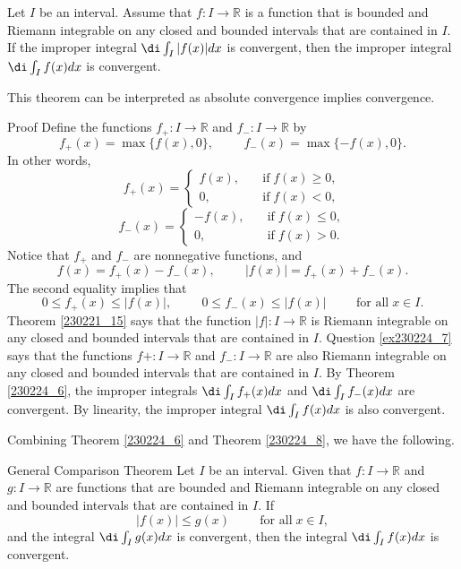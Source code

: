 \begin{example}[label=20230527]{}
\begin{theorem}[label=230224_8]{} Let $I$ be an interval.
Assume that $f:I\to\mathbb{R}$ is a function that is bounded and Riemann integrable on any closed and bounded intervals that are contained in $I$. If the improper integral $\di\int_I|f(x)|dx$ is convergent, then the improper integral $\di\int_If(x)dx$ is convergent.
\end{theorem}This theorem can be interpreted as absolute convergence implies convergence.
\begin{myproof}{Proof}
 Define the functions $f_+:I\to\mathbb{R}$ and $f_-:I\to\mathbb{R}$ by
\[f_+(x)=\max\{f(x), 0\},\hspace{1cm}f_-(x)=\max\{-f(x),0\}.\]
In other words,  \[f_+(x)=\begin{cases} f(x),\quad &\text{if}\; f(x)\geq 0,\\0,\quad &\text{if}\;f(x)<0,\end{cases}\]
\[f_-(x)=\begin{cases} -f(x),\quad &\text{if}\; f(x)\leq 0,\\0,\quad &\text{if}\;f(x)>0.\end{cases}\]  Notice that $f_+$ and $f_-$ are nonnegative functions, and
\[f(x)=f_+(x)-f_-(x),\hspace{1cm}|f(x)|=f_+(x)+f_-(x).\]
The second equality implies that
\[0\leq f_+(x)\leq |f(x)|,\hspace{1cm}0\leq f_-(x)\leq |f(x)|\hspace{1cm}\text{for all}\;x\in I.\]Theorem \ref{230221_15} says that the function $|f|:I\to\mathbb{R}$ is Riemann integrable on any closed and bounded intervals that are contained in $I$. \bp Question \ref{ex230224_7} says that the functions $f+:I\to\mathbb{R}$ and $f_-:I\to\mathbb{R}$ are also Riemann integrable on any closed and bounded intervals that are contained in $I$.  By Theorem  \ref{230224_6}, the improper integrals $\di \int_If_+(x)dx$ and $\di \int_If_-(x)dx$ are convergent. By linearity, the improper integral $\di\int_I f(x)dx$ is also convergent.

\end{myproof}

Combining Theorem \ref{230224_6} and Theorem \ref{230224_8}, we have the following.
\begin{theorem}[label=230224_9]{General Comparison Theorem}
 Let $I$ be an interval. Given that $f:I\to\mathbb{R}$ and $g:I\to\mathbb{R}$ are  functions that are bounded and Riemann integrable on any closed and bounded  intervals that are contained in $I$. If
\[|f(x)|\leq g(x)\hspace{1cm}\text{for all}\;x\in I,\]
and the integral $\di\int_Ig(x)dx$ is convergent, then the integral $\di\int_I f(x)dx$ is convergent. 
\end{theorem}
 


\end{example}
